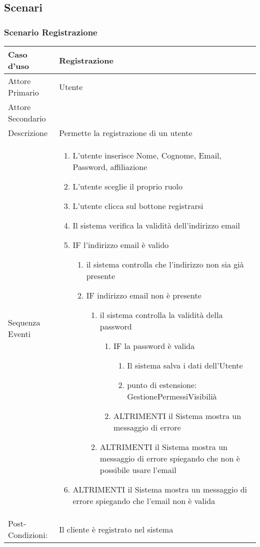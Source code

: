 \subsection{Scenari}
\label{sec:scenari}

\subsubsection{Scenario Registrazione}
\label{sec:scenari:registrazione}
\begin{tabular}{|p{3cm}|p{7cm}|}
\hline 
\rowcolor{Orchid}
Caso d'uso & Registrazione \\
\hline
Attore Primario & Utente\\
\hline
Attore Secondario & \\
\hline
Descrizione & Permette la registrazione di un utente\\
\hline
  Sequenza Eventi &
  \begin{enumerate}
    \item L'utente inserisce Nome, Cognome, Email, Password, affiliazione
    \item L'utente sceglie il proprio ruolo
    \item L'utente clicca sul bottone registrarsi
    \item Il sistema verifica la validità dell'indirizzo email
    \item IF l'indirizzo email è valido
   \begin{enumerate}
    \item il sistema controlla che l'indirizzo non sia già presente
     \item IF indirizzo email non è presente
       \begin{enumerate}
         \item il sistema controlla la validità della password
           \begin{enumerate}
            \item IF la password è valida
               \begin{enumerate}
               \item Il sistema salva i dati dell'Utente
               \item punto di estensione: GestionePermessiVisibilià
               \end{enumerate}
            \item ALTRIMENTI il Sistema mostra un messaggio di errore
          \end{enumerate}
        \item ALTRIMENTI il Sistema mostra un messaggio di errore spiegando che non è possibile usare l'email
       \end{enumerate}         
      \end{enumerate}
 \item ALTRIMENTI il Sistema mostra un messaggio di errore spiegando che l'email non è valida
  \end{enumerate}\\
\hline
Post-Condizioni: & Il cliente è registrato nel sistema \\
  \hline
\end{tabular}\\ 
